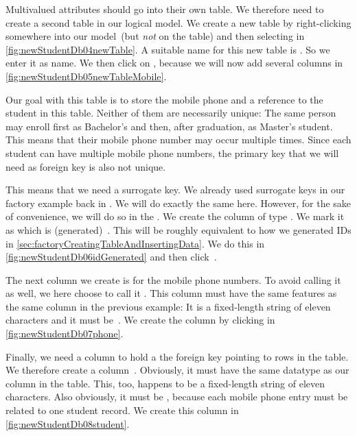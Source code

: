 Multivalued attributes should go into their own table.
We therefore need to create a second table in our logical model.
We create a new table by right-clicking somewhere into our model~(but \emph{not} on the  table) and then selecting  in \cref{fig:newStudentDb04newTable}.
A suitable name for this new table is .
So we enter it as name.
We then click on , because we will now add several columns in \cref{fig:newStudentDb05newTableMobile}.

Our goal with this table is to store the mobile phone and a reference to the student in this table.
Neither of them  are necessarily unique:
The same person may enroll first as Bachelor's and then, after graduation, as Master's student.
This means that their mobile phone number may occur multiple times.
Since each student can have multiple mobile phone numbers, the primary key  that we will need as foreign key is also not unique.

This means that we need a surrogate key.
We already used surrogate keys in our factory example back in .
We will do exactly the same here.
However, for the sake of convenience, we will do so in the \pgmodeler.
We create the column  of type .
We mark it as  which is (generated)~.
This will be roughly equivalent to how we generated IDs in \cref{sec:factoryCreatingTableAndInsertingData}.
We do this in \cref{fig:newStudentDb06idGenerated} and then click~.

The next column we create is for the mobile phone numbers.
To avoid calling it  as well, we here choose to call it .
This column must have the same features as the same column in the previous example:
It is a fixed-length string of eleven characters and it must be~.
We create the column by clicking  in \cref{fig:newStudentDb07phone}.

Finally, we need a column to hold a the foreign key  pointing to rows in the  table.
We therefore create a column~.
Obviously, it must have the same datatype as our  column in the  table.
This, too, happens to be a fixed-length string of eleven characters.
Also obviously, it must be , because each mobile phone entry must be related to one student record.
We create this column in \cref{fig:newStudentDb08student}.

